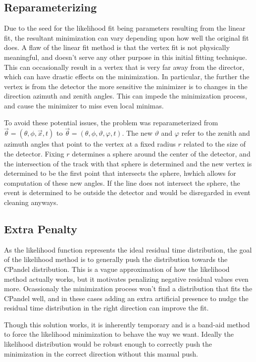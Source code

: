 \subsection{Reparameterizing}

Due to the seed for the likelihood fit being parameters resulting from the linear fit, the resultant minimization can vary depending upon how well the original fit does. A flaw of the linear fit method is that the vertex fit is not physically meaningful, and doesn't serve any other purpose in this initial fitting technique. This can occasionally result in a vertex that is very far away from the director, which can have drastic effects on the minimization. In particular, the further the vertex is from the detector the more sensitive the minimizer is to changes in the direction azimuth and zenith angles. This can impede the minimization process, and cause the minimizer to miss even local minimas.

To avoid these potential issues, the problem was reparameterized from $\vec{\theta} = (\theta, \phi, \vec{x}, t)$ to $\vec{\theta} = (\theta, \phi, \vartheta, \varphi, t)$. The new $\vartheta$ and $\varphi$ refer to the zenith and azimuth angles that point to the vertex at a fixed radius $r$ related to the size of the detector. Fixing $r$ determines a sphere around the center of the detector, and the intersection of the track with that sphere is determined and the new vertex is determined to be the first point that intersects the sphere, hwhich allows for computation of these new angles. If the line does not intersect the sphere, the event is determined to be outside the detector and would be disregarded in event cleaning anyways. 

\subsection{Extra Penalty}

As the likelihood function represents the ideal residual time distribution, the goal of the likelihood method is to generally push the distribution towards the CPandel distribution. This is a vague approximation of how the likelihood method actually works, but it motivates penalizing negative residual values even more. Ocassionaly the minimization process won't find a distribution that fits the CPandel well, and in these cases adding an extra artificial presence to nudge the residual time distribution in the right direction can improve the fit.

Though this solution works, it is inherently temporary and is a band-aid method to force the likelihood minimization to behave the way we want. Ideally the likelihood distribution would be robust enough to correctly push the minimization in the correct direction without this manual push. 
